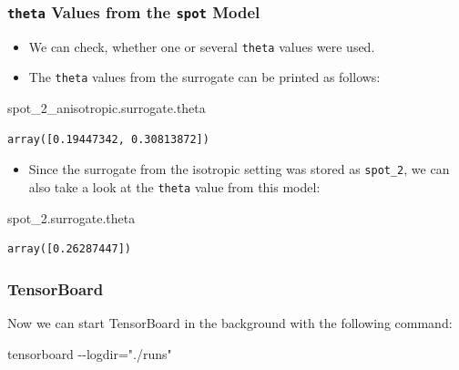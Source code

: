 \documentclass[
  letterpaper,
  DIV=11,
  numbers=noendperiod]{scrreprt}
\newenvironment{Shaded}{\begin{snugshade}}{\end{snugshade}}
\newcommand{\NormalTok}[1]{\textcolor[rgb]{0.00,0.23,0.31}{#1}}
\providecommand{\tightlist}{%
  \setlength{\itemsep}{0pt}\setlength{\parskip}{0pt}}\usepackage{longtable,booktabs,array}
\begin{document}
\hypertarget{theta-values-from-the-spot-model}{%
\subsubsection{\texorpdfstring{\texttt{theta} Values from the
\texttt{spot}
Model}{theta Values from the spot Model}}\label{theta-values-from-the-spot-model}}

\begin{itemize}
\tightlist
\item
  We can check, whether one or several \texttt{theta} values were used.
\item
  The \texttt{theta} values from the surrogate can be printed as
  follows:
\end{itemize}

\begin{Shaded}
\begin{Highlighting}[]
\NormalTok{spot\_2\_anisotropic.surrogate.theta}
\end{Highlighting}
\end{Shaded}

\begin{verbatim}
array([0.19447342, 0.30813872])
\end{verbatim}

\begin{itemize}
\tightlist
\item
  Since the surrogate from the isotropic setting was stored as
  \texttt{spot\_2}, we can also take a look at the \texttt{theta} value
  from this model:
\end{itemize}

\begin{Shaded}
\begin{Highlighting}[]
\NormalTok{spot\_2.surrogate.theta}
\end{Highlighting}
\end{Shaded}

\begin{verbatim}
array([0.26287447])
\end{verbatim}

\hypertarget{tensorboard-3}{%
\subsubsection{TensorBoard}\label{tensorboard-3}}

Now we can start TensorBoard in the background with the following
command:

\begin{Shaded}
\begin{Highlighting}[]
\NormalTok{tensorboard {-}{-}logdir="./runs"}
\end{Highlighting}
\end{Shaded}
\end{document}
